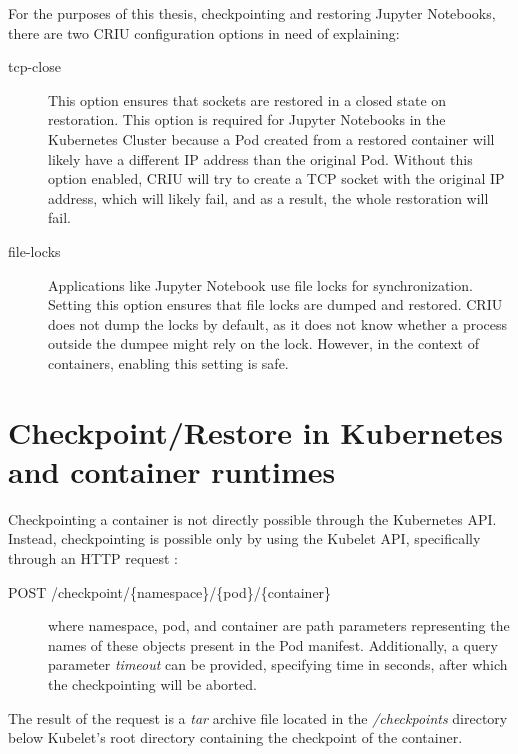 \documentclass[
  digital,     %
  oneside,     %
  nosansbold,  %
  nocolorbold, %
  lof,         %
  nolot,         %
]{fithesis4}
\begin{document}
For the purposes of this thesis, checkpointing and restoring Jupyter Notebooks, there are two CRIU configuration options in need of explaining:

\begin{description}

    \item[tcp-close] This option ensures that sockets are restored in a closed state on restoration. This option is required for Jupyter Notebooks in the Kubernetes Cluster because a Pod created from a restored container will likely have a different IP address than the original Pod. Without this option enabled, CRIU will try to create a TCP socket with the original IP address, which will likely fail, and as a result, the whole restoration will fail.
    
    \item[file-locks] Applications like Jupyter Notebook use file locks for synchronization. Setting this option ensures that file locks are dumped and restored. CRIU does not dump the locks by default, as it does not know whether a process outside the dumpee might rely on the lock. However, in the context of containers, enabling this setting is safe.

\end{description}


\section{Checkpoint/Restore in Kubernetes and container runtimes}
\label{sec:criu:kubernetes}

Checkpointing a container is not directly possible through the Kubernetes API. Instead, checkpointing is possible only by using the Kubelet API, specifically through an HTTP request \cite{k8s_kubelet_api}:

\begin{description}
    \item[POST /checkpoint/\{namespace\}/\{pod\}/\{container\}] where namespace, pod, and container are path parameters representing the names of these objects present in the Pod manifest. Additionally, a query parameter \emph{timeout} can be provided, specifying time in seconds, after which the checkpointing will be aborted.
\end{description}
The result of the request is a \emph{tar} archive file located in the \emph{/checkpoints} directory below Kubelet's root directory containing the checkpoint of the container.
\end{document}
